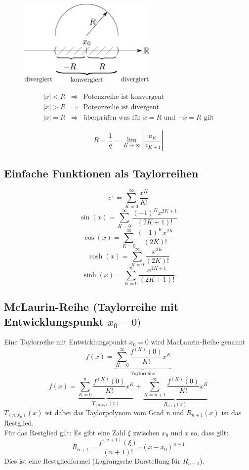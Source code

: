 \begin{figure}[h!]
\centering
\includegraphics[width=0.6\textwidth]{konvergenzradius.pdf}
\end{figure}

\[ \boxed{ \begin{array}{lll} 
    |x| < R & \Rightarrow & \text{Potenzreihe ist konvergent} \\
    |x| > R & \Rightarrow & \text{Potenzreihe ist divergent} \\
    |x| = R & \Rightarrow & \text{überprüfen was für $x=R$ und $-x=R$ gilt}
\end{array} } \]

\[ \boxed{R = \frac{1}{q} = \lim_{K \rightarrow \infty} \left| \frac{a_K}{a_{K + 1}} \right|} \]

\subsection{Einfache Funktionen als Taylorreihen}
\[ \boxed{e^x = \sum_{K=0}^{\infty} \frac{x^K}{K!}} \]
\[ \boxed{\sin(x) = \sum_{K=0}^{\infty} \frac{(-1)^K x^{2K+1}}{(2K+1)!}} \]
\[ \boxed{\cos(x) = \sum_{K=0}^{\infty} \frac{(-1)^K x^{2K}}{(2K)!}} \]
\[ \boxed{\cosh(x) = \sum_{K=0}^{\infty} \frac{x^{2K}}{(2K)!}} \]
\[ \boxed{\sinh(x) = \sum_{K=0}^{\infty} \frac{x^{2K+1}}{(2K+1)!}} \]

\subsection{McLaurin-Reihe (Taylorreihe mit Entwicklungspunkt $x_0 = 0)$}
Eine Taylorreihe mit Entwicklungspunkt $x_0 = 0$ wird MacLaurin-Reihe genannt
\[ \boxed{f(x) = \underbrace{\sum_{K=0}^{\infty}\frac{f^{(K)}(0)}{K!} x^K}_{\text{Taylorreihe}}} \]
\[ \boxed{f(x) = \underbrace{\sum_{K=0}^{n}\frac{f^{(K)}(0)}{K!} x^K}_{T_{(n,x_0)}(x)} + \underbrace{\sum_{K=n+1}^{\infty}\frac{f^{(K)}(0)}{K!} x^K}_{R_{n+1}(x)}} \]
$T_{(n,x_0)}(x)$ ist dabei das Taylorpolynom vom Grad n und $R_{n+1}(x)$ ist das Restglied. \\
Für das Restglied gilt: Es gibt eine Zahl $\xi$ zwischen $x_0$ und $x$ so, dass gilt:
\[ \boxed{R_{n+1} = \frac{f^{(n + 1)}(\xi)}{(n + 1)!} \cdot (x - x_0)^{n + 1}} \]
Dies ist eine Restgliedformel (Lagrangsche Darstellung für $R_{n + 1}$).



